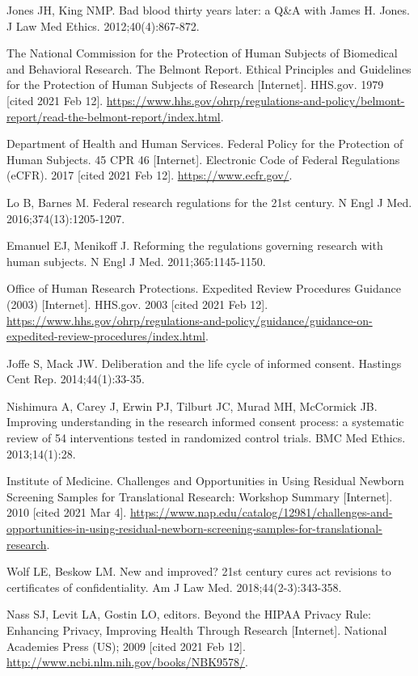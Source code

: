 \begin{references}
\item Jones JH, King NMP. Bad blood thirty years later: a Q\&A with James H. Jones. J Law Med Ethics. 2012;40(4):867-872.
\item The National Commission for the Protection of Human Subjects of Biomedical and Behavioral Research. The Belmont Report. Ethical Principles and Guidelines for the Protection of Human Subjects of Research [Internet]. HHS.gov. 1979 [cited 2021 Feb 12]. \url{https://www.hhs.gov/ohrp/regulations-and-policy/belmont-report/read-the-belmont-report/index.html}.
\item Department of Health and Human Services. Federal Policy for the Protection of Human Subjects. 45 CPR 46 [Internet]. Electronic Code of Federal Regulations (eCFR). 2017 [cited 2021 Feb 12]. \url{https://www.ecfr.gov/}.
\item Lo B, Barnes M. Federal research regulations for the 21st century. N Engl J Med. 2016;374(13):1205-1207.
\item Emanuel EJ, Menikoff J. Reforming the regulations governing research with human subjects. N Engl J Med. 2011;365:1145-1150.
\item Office of Human Research Protections. Expedited Review Procedures Guidance (2003) [Internet]. HHS.gov. 2003 [cited 2021 Feb 12]. \url{https://www.hhs.gov/ohrp/regulations-and-policy/guidance/guidance-on-expedited-review-procedures/index.html}.
\item Joffe S, Mack JW. Deliberation and the life cycle of informed consent. Hastings Cent Rep. 2014;44(1):33-35.
\item Nishimura A, Carey J, Erwin PJ, Tilburt JC, Murad MH, McCormick JB. Improving understanding in the research informed consent process: a systematic review of 54 interventions tested in randomized control trials. BMC Med Ethics. 2013;14(1):28.
\item Institute of Medicine. Challenges and Opportunities in Using Residual Newborn Screening Samples for Translational Research: Workshop Summary [Internet]. 2010 [cited 2021 Mar 4]. \url{https://www.nap.edu/catalog/12981/challenges-and-opportunities-in-using-residual-newborn-screening-samples-for-translational-research}.
\item Wolf LE, Beskow LM. New and improved? 21st century cures act revisions to certificates of confidentiality. Am J Law Med. 2018;44(2-3):343-358.
\item Nass SJ, Levit LA, Gostin LO, editors. Beyond the HIPAA Privacy Rule: Enhancing Privacy, Improving Health Through Research [Internet]. National Academies Press (US); 2009 [cited 2021 Feb 12]. \url{http://www.ncbi.nlm.nih.gov/books/NBK9578/}.

\end{references}
